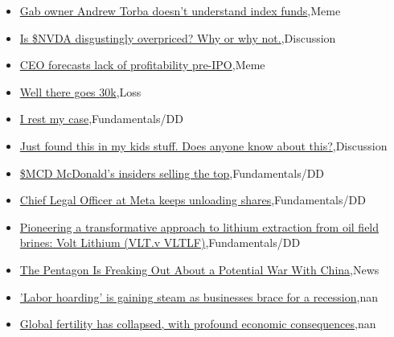\documentclass{article}%
\begin{document}
%
\begin{itemize}%
\item%
\href{https://reddit.com/r/wallstreetbets/comments/145uwm3/gab\_owner\_andrew\_torba\_doesnt\_understand\_index/}{Gab owner Andrew Torba doesn't understand index funds},Meme%
\item%
\href{https://reddit.com/r/wallstreetbets/comments/145r5yd/is\_nvda\_disgustingly\_overpriced\_why\_or\_why\_not/}{Is \$NVDA disgustingly overpriced? Why or why not.},Discussion%
\item%
\href{https://reddit.com/r/wallstreetbets/comments/145qc96/ceo\_forecasts\_lack\_of\_profitability\_preipo/}{CEO forecasts lack of profitability pre-IPO},Meme%
\item%
\href{https://reddit.com/r/wallstreetbets/comments/145poxx/well\_there\_goes\_30k/}{Well there goes 30k},Loss%
\item%
\href{https://reddit.com/r/StockMarket/comments/145sa3u/i\_rest\_my\_case/}{I rest my case},Fundamentals/DD%
\item%
\href{https://reddit.com/r/StockMarket/comments/145ov6e/just\_found\_this\_in\_my\_kids\_stuff\_does\_anyone\_know/}{Just found this in my kids stuff. Does anyone know about this?},Discussion%
\item%
\href{https://reddit.com/r/StockMarket/comments/145jlg2/mcd\_mcdonalds\_insiders\_selling\_the\_top/}{\$MCD McDonald's insiders selling the top},Fundamentals/DD%
\item%
\href{https://reddit.com/r/StockMarket/comments/145jjch/chief\_legal\_officer\_at\_meta\_keeps\_unloading\_shares/}{Chief Legal Officer at Meta keeps unloading shares},Fundamentals/DD%
\item%
\href{https://reddit.com/r/StockMarket/comments/145imnd/pioneering\_a\_transformative\_approach\_to\_lithium/}{Pioneering a transformative approach to lithium extraction from oil field brines: Volt Lithium (VLT.v VLTLF)},Fundamentals/DD%
\item%
\href{https://reddit.com/r/Economics/comments/145hxqz/the\_pentagon\_is\_freaking\_out\_about\_a\_potential/}{The Pentagon Is Freaking Out About a Potential War With China},News%
\item%
\href{https://reddit.com/r/Economics/comments/145de39/labor\_hoarding\_is\_gaining\_steam\_as\_businesses/}{'Labor hoarding' is gaining steam as businesses brace for a recession},nan%
\item%
\href{https://reddit.com/r/Economics/comments/145d61x/global\_fertility\_has\_collapsed\_with\_profound/}{Global fertility has collapsed, with profound economic consequences},nan%
\end{itemize}%
\end{document}
